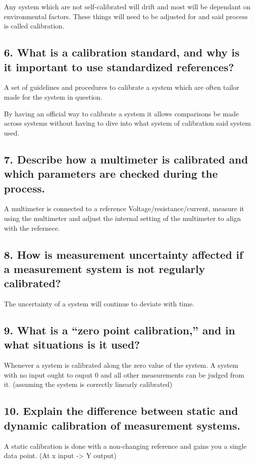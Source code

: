 Any system which are not self-calibrated will drift and most will be dependant on environmental factors. These things will need to be adjusted for and said process is called calibration.


\subsection{\textbf{6. What is a calibration standard, and why is it important to use standardized references?}}
A set of guidelines and procedures to calibrate a system which are often tailor made for the system in question. 

By having an official way to calibrate a system it allows comparisons be made across systems without having to dive into what system of calibration said system used.

\subsection{\textbf{7. Describe how a multimeter is calibrated and which parameters are checked during the process.}}
A multimeter is connected to a reference Voltage/resistance/current, measure it using the multimeter and adjust the internal setting of the multimeter to align with the refernece.

\subsection{\textbf{8. How is measurement uncertainty affected if a measurement system is not regularly calibrated?}}
The uncertainty of a system will continue to deviate with time.

\subsection{\textbf{9. What is a “zero point calibration,” and in what situations is it used?}}
Whenever a system is calibrated along the zero value of the system. A system with no input ought to ouput 0 and all other measurements can be judged from it. (assuming the system is correctly linearly calibrated)

\subsection{\textbf{10. Explain the difference between static and dynamic calibration of measurement systems.}}
A static calibration is done with a non-changing reference and gains you a single data point. (At x input -> Y output)

